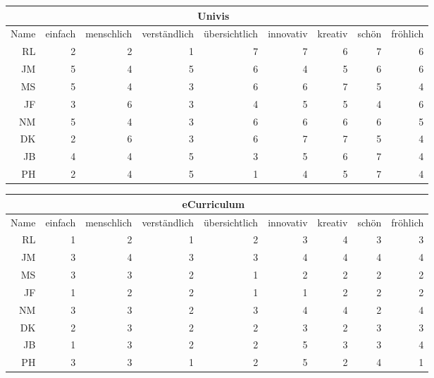 \documentclass[a4paper,10pt]{scrartcl}
\begin{document}
\begin{center}
\begin{tabular}{r|r|r|r|r|r|r|r|r}
     & \multicolumn{7}{c}{Univis} \\ \hline
    Name & einfach & menschlich & verständlich & übersichtlich & innovativ & kreativ & schön & fröhlich \\ \hline
    RL & 2 & 2 & 1 & 7 & 7 & 6 & 7 & 6 \\ \hline
    JM & 5 & 4 & 5 & 6 & 4 & 5 & 6 & 6 \\ \hline
    MS & 5 & 4 & 3 & 6 & 6 & 7 & 5 & 4 \\ \hline
    JF & 3 & 6 & 3 & 4 & 5 & 5 & 4 & 6 \\ \hline
    NM & 5 & 4 & 3 & 6 & 6 & 6 & 6 & 5 \\ \hline
    DK & 2 & 6 & 3 & 6 & 7 & 7 & 5 & 4 \\ \hline
    JB & 4 & 4 & 5 & 3 & 5 & 6 & 7 & 4 \\ \hline
    PH & 2 & 4 & 5 & 1 & 4 & 5 & 7 & 4 \\
\end{tabular}
\end{center}

\begin{center}
\begin{tabular}{r|r|r|r|r|r|r|r|r}
     & \multicolumn{7}{c}{eCurriculum} \\ \hline
    Name & einfach & menschlich & verständlich & übersichtlich & innovativ & kreativ & schön & fröhlich \\ \hline
    RL & 1 & 2 & 1 & 2 & 3 & 4 & 3 & 3 \\ \hline
    JM & 3 & 4 & 3 & 3 & 4 & 4 & 4 & 4 \\ \hline
    MS & 3 & 3 & 2 & 1 & 2 & 2 & 2 & 2 \\ \hline
    JF & 1 & 2 & 2 & 1 & 1 & 2 & 2 & 2 \\ \hline
    NM & 3 & 3 & 2 & 3 & 4 & 4 & 2 & 4 \\ \hline
    DK & 2 & 3 & 2 & 2 & 3 & 2 & 3 & 3 \\ \hline
    JB & 1 & 3 & 2 & 2 & 5 & 3 & 3 & 4 \\ \hline
    PH & 3 & 3 & 1 & 2 & 5 & 2 & 4 & 1 \\
\end{tabular}
\end{center}
\end{document}

